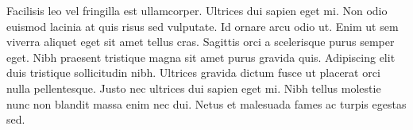 Facilisis leo vel fringilla est ullamcorper. Ultrices dui sapien eget mi. Non odio euismod lacinia at quis risus sed vulputate. Id ornare arcu odio ut. Enim ut sem viverra aliquet eget sit amet tellus cras. Sagittis orci a scelerisque purus semper eget. Nibh praesent tristique magna sit amet purus gravida quis. Adipiscing elit duis tristique sollicitudin nibh. Ultrices gravida dictum fusce ut placerat orci nulla pellentesque. Justo nec ultrices dui sapien eget mi. Nibh tellus molestie nunc non blandit massa enim nec dui. Netus et malesuada fames ac turpis egestas sed.